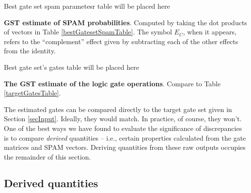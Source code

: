 \documentclass{article}[11pt]
\newcommand{\putfield}[2]{#2}
\begin{document}
\begin{table}[h]
\begin{center}
\putfield{bestGatesetSpamParametersTable}{Best gate set spam parametesr table will be placed here}
\caption{\putfield{tt_bestGatesetSpamParametersTable}{}\textbf{GST estimate of SPAM probabilities}.  Computed by taking the dot products of vectors in Table \ref{bestGatesetSpamTable}.  The symbol $E_C$, when it appears, refers to the ``complement'' effect given by subtracting each of the other effects from the identity.\label{bestGatesetSpamParametersTable}}
\end{center}
\end{table}

\begin{table}[h]
\begin{center}
\putfield{bestGatesetGatesTable}{Best gate set's gates table will be placed here}
\caption{\putfield{tt_bestGatesetGatesTable}{}\textbf{The GST estimate of the logic gate operations}.  Compare to Table \ref{targetGatesTable}.\label{bestGatesetGatesTable}}
\end{center}
\end{table}

The estimated gates can be compared directly to the target gate set given in Section \ref{secInput}.  Ideally, they would match.  In practice, of course, they won't.  One of the best ways we have found to evaluate the significance of discrepancies is to compare \emph{derived} quantities -- i.e., certain properties calculated from the gate matrices and SPAM vectors.  Deriving quantities from these raw outputs occupies the remainder of this section.
\clearpage

\subsection{Derived quantities\label{derivedQtySection}}
\end{document}
